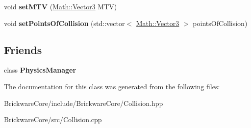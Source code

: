 \begin{DoxyCompactItemize}
\item 
\hypertarget{classBrickware_1_1Core_1_1Collision_a73a52ad0db213a1adc5655d2554a87e3}{}void {\bfseries set\+M\+T\+V} (\hyperlink{classBrickware_1_1Math_1_1Vector3}{Math\+::\+Vector3} M\+T\+V)\label{classBrickware_1_1Core_1_1Collision_a73a52ad0db213a1adc5655d2554a87e3}

\item 
\hypertarget{classBrickware_1_1Core_1_1Collision_a1dcde281e4192658763be674e2ec8f04}{}void {\bfseries set\+Points\+Of\+Collision} (std\+::vector$<$ \hyperlink{classBrickware_1_1Math_1_1Vector3}{Math\+::\+Vector3} $>$ points\+Of\+Collision)\label{classBrickware_1_1Core_1_1Collision_a1dcde281e4192658763be674e2ec8f04}

\end{DoxyCompactItemize}
\subsection*{Friends}
\begin{DoxyCompactItemize}
\item 
\hypertarget{classBrickware_1_1Core_1_1Collision_a139cf05ac01161b7071c8a037c841683}{}class {\bfseries Physics\+Manager}\label{classBrickware_1_1Core_1_1Collision_a139cf05ac01161b7071c8a037c841683}

\end{DoxyCompactItemize}


The documentation for this class was generated from the following files\+:\begin{DoxyCompactItemize}
\item 
Brickware\+Core/include/\+Brickware\+Core/Collision.\+hpp\item 
Brickware\+Core/src/Collision.\+cpp\end{DoxyCompactItemize}
